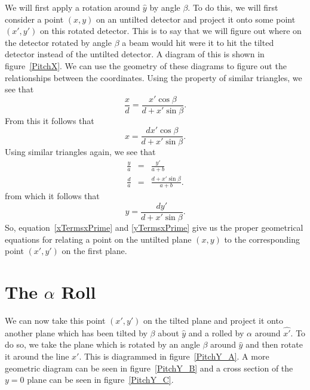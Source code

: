 We will first apply a rotation around $\hat{y}$ by angle $\beta$.
To do this, we will first consider a point $(x,y)$ on an
untilted detector and project it onto some point $(x',y')$ 
on this rotated detector.
This is to say that we will figure out where on the detector
rotated by angle $\beta$ a
beam would hit were it to hit the tilted detector
instead of the untilted detector.
A diagram of this is shown in figure~\ref{PitchX}.  
We can use the geometry of these diagrams to figure out
the relationships between the coordinates. Using
the property of similar triangles, we see that
\begin{equation}
    \frac{x}{d}=\frac{x'\cos\beta}{d+x'\sin\beta}.
\end{equation}
From this it follows that 
\begin{equation}\label{xTermsxPrime}
    \boxed{x = \frac{dx'\cos\beta}{d+x'\sin\beta}.}
\end{equation}
Using similar triangles again, we see that
\begin{eqnarray}
    \frac{y}{a}&=&\frac{y'}{a+b}\\
    \frac{d}{a}&=&\frac{d+x'\sin\beta}{a+b}.
\end{eqnarray}
from which it follows that
\begin{equation}\label{yTermsxPrime}
	\boxed{y= \frac{dy'}{d+x'\sin\beta}.}
\end{equation}
So, equation~\ref{xTermsxPrime} and \ref{yTermsxPrime} give us 
the proper geometrical equations for relating a point on the 
untilted plane $(x,y)$ to the corresponding point 
$(x',y')$ on the first plane.

\section{\texorpdfstring{The $\alpha$ Roll}{The alpha Roll}}

We can now take this point $(x',y')$ on the tilted 
plane and project it onto another plane which has been
tilted by $\beta$ about $\hat y$ and a rolled by
$\alpha$ around $\hat{x'}$. 
To do so, we take the plane which is
rotated by an angle $\beta$ around $\hat{y}$ and then
rotate it around the line $x'$. 
This is diagrammed in figure~\ref{PitchY_A}. 
A more geometric diagram can be seen in 
figure~\ref{PitchY_B} and a cross section of the $y=0$
plane can be seen in figure~\ref{PitchY_C}.

\begin{SCfigure}[1][htbp]
    \centering
     
    \label{PitchY_A}
    \caption{A diagram of a plane that has been 
    tilted about the $\hat y$ axis by angle
    $\beta$ and then about $\hat x'$ by angle
    $\alpha$.}
\end{SCfigure}

